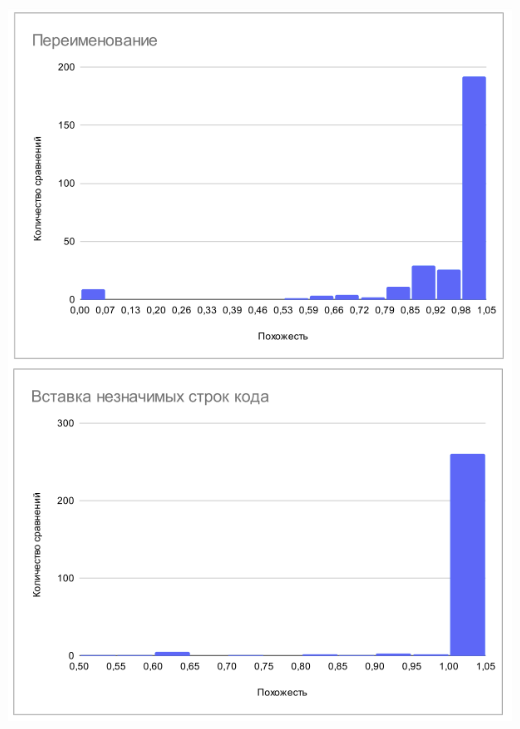 \documentclass[10pt]{beamer}
\begin{document}
\begin{frame}
\begin{columns}[C]
	\centering
	\includegraphics[scale=0.25]{res2.png}
	
\end{columns}
	
\end{frame}
\end{document}
